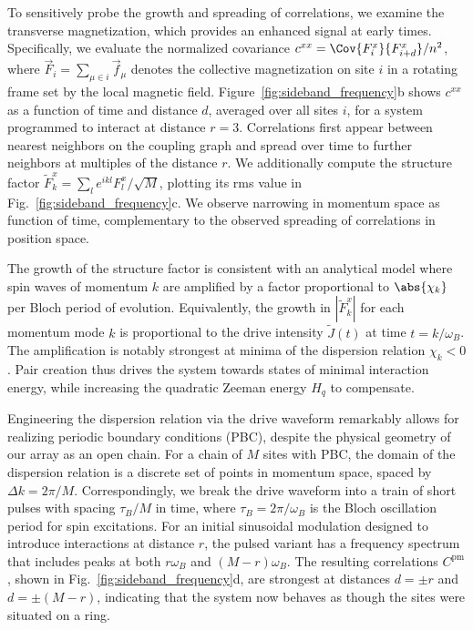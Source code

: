 \documentclass[aps,pra,superscriptaddress,12pt]{revtex4-1} %
\begin{document}
\begin{bibunit}
To sensitively probe the growth and spreading of correlations, we examine the transverse magnetization, which provides an enhanced signal at early times.  Specifically, we evaluate the normalized covariance ${c^{xx} = {\Cov{F^x_i}{F^x_{i + d}}}/n^2}$, where $\vec{F}_i = \sum_{\mu \in i} \vec{f}_\mu$ denotes the collective magnetization on site $i$ in a rotating frame set by the local magnetic field.  Figure~\ref{fig:sideband_frequency}b shows $c^{xx}$ as a function of time and distance $d$, averaged over all sites $i$, for a system programmed to interact at distance $r = 3$.  Correlations first appear between nearest neighbors on the coupling graph and spread over time to further neighbors at multiples of the distance $r$. We additionally compute the structure factor $\tilde{F}^x_k = \sum_l e^{i k l}F^x_l/\sqrt{M}$, plotting its rms value in Fig.~\ref{fig:sideband_frequency}c.  We observe narrowing in momentum space as function of time, complementary to the observed spreading of correlations in position space.

The growth of the structure factor is consistent with an analytical model where spin waves of momentum $k$ are amplified by a factor proportional to $\abs{\chi_k}$ per Bloch period of evolution.  Equivalently, the growth in $|\tilde{F}_k^x|$ for each momentum mode $k$ is proportional to the drive intensity $\tilde{J}(t)$ at time $t=k/\omega_B$.  The amplification is notably strongest at minima of the dispersion relation $\chi_k < 0$. Pair creation thus drives the system towards states of minimal interaction energy, while increasing the quadratic Zeeman energy $H_q$ to compensate.

Engineering the dispersion relation via the drive waveform remarkably allows for realizing periodic boundary conditions (PBC), despite the physical geometry of our array as an open chain.  For a chain of $M$ sites with PBC, the domain of the dispersion relation is a discrete set of points in momentum space, spaced by $\Delta k = 2\pi/M$.  Correspondingly, we break the drive waveform into a train of short pulses with spacing $\tau_B/M$ in time, where $\tau_B = 2\pi/\omega_B$ is the Bloch oscillation period for spin excitations. For an initial sinusoidal modulation designed to introduce interactions at distance $r$, the pulsed variant has a frequency spectrum that includes peaks at both $r\omega_B$ and $(M - r)\omega_B$.  The resulting correlations $C^\mathrm{pm}$, shown in Fig.~\ref{fig:sideband_frequency}d, are strongest at distances $d=\pm r$ and $d = \pm (M-r)$, indicating that the system now behaves as though the sites were situated on a ring.


\end{bibunit}
\end{document}
